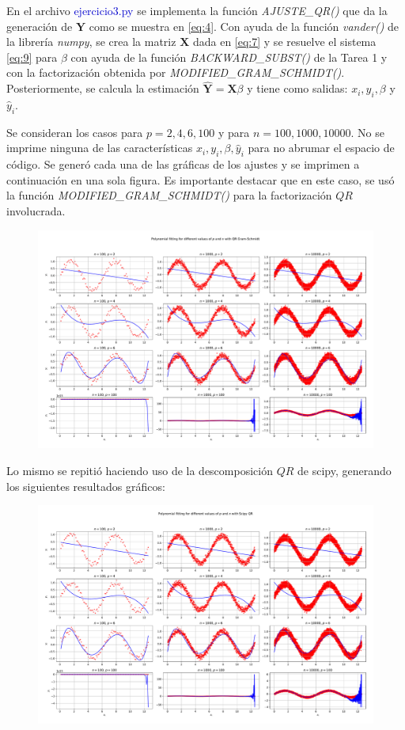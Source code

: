 En el archivo \textcolor{mediumblue}{ejercicio3.py} se implementa la función \textit{AJUSTE\_QR()} que da la generación de $\mathbf{Y}$ como se muestra en \eqref{eq:4}. Con ayuda de la función \textit{vander()} de la librería \textit{numpy}, se crea la matriz $\mathbf{X}$ dada en \eqref{eq:7} y se resuelve el sistema \eqref{eq:9} para $\beta$ con ayuda de la función \textit{BACKWARD\_SUBST()} de la Tarea 1 y con la factorización obtenida por \textit{MODIFIED\_GRAM\_SCHMIDT()}. Posteriormente, se calcula la estimación $\hat{\mathbf{Y}} = \mathbf{X} \beta$ y tiene como salidas: $x_i, y_i, \beta$ y $\hat{y}_i$.

Se consideran los casos para $p=2,4,6,100$ y para $n=100, 1000, 10000$. No se imprime ninguna de las características $x_i, y_i, \beta, \hat{y}_i$ para no abrumar el espacio de código. Se generó cada una de las gráficas de los ajustes y se imprimen a continuación en una sola figura. Es importante destacar que en este caso, se usó la función \textit{MODIFIED\_GRAM\_SCHMIDT()} para la factorización $QR$ involucrada.
\begin{figure}[h!]
	\centering
	\includegraphics[width=\textwidth]{IMAGENES/gram_schmidt.pdf}
\end{figure}

\vspace{2.5cm}
Lo mismo se repitió haciendo uso de la descomposición $QR$ de scipy, generando los siguientes resultados gráficos:
\begin{figure}[h!]
	\centering
	\includegraphics[width=\textwidth]{IMAGENES/scipy.pdf}
\end{figure}

